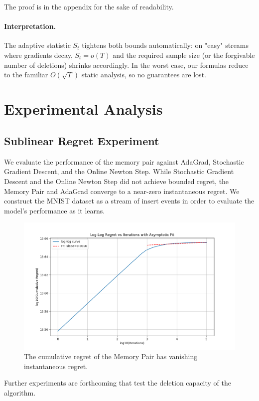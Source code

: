 \documentclass{article}
\theoremstyle{ssltheorem}
\begin{document}
The proof is in the appendix for the sake of readability.
\paragraph{Interpretation.}
The adaptive statistic $S_{t}$ tightens both bounds automatically:
on "easy" streams where gradients decay, $S_{t}=o(T)$ and the required
sample size (or the forgivable number of deletions) shrinks
accordingly.
In the worst case, our formulas reduce to the familiar
$O(\sqrt{T})$ static analysis, so no guarantees are lost.
\section{Experimental Analysis}

\subsection{Sublinear Regret Experiment}

We evaluate the performance of the memory pair against AdaGrad, Stochastic Gradient Descent, and the Online Newton Step.
While Stochastic Gradient Descent and the Online Newton Step did not achieve bounded regret, the Memory Pair and AdaGrad converge to a near-zero instantaneous regret.
We construct the MNIST dataset as a stream of insert events in order to evaluate the model's performance as it learns.
\begin{figure}
    \centering
    \includegraphics[width=1\linewidth]{rotmnist_drift_memorypair_loglog_fit.png}
    \caption{The cumulative regret of the Memory Pair has vanishing instantaneous regret.}
    \label{fig:enter-label}
\end{figure}

Further experiments are forthcoming that test the deletion capacity of the algorithm.
\end{document}
